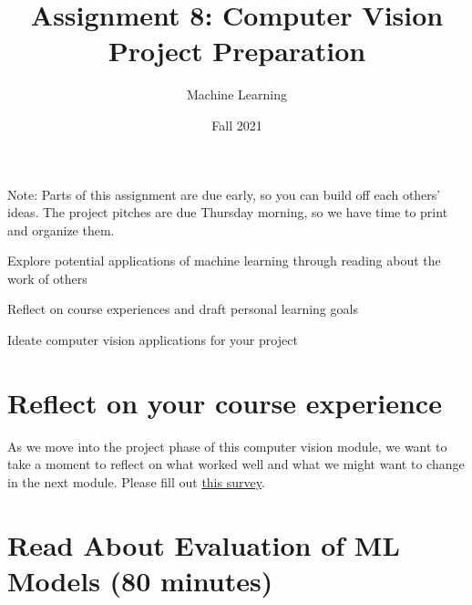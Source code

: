 \documentclass[assignment08_Solutions]{subfiles}
\title{Assignment 8: Computer Vision Project Preparation}
\author{Machine Learning}
\date{Fall 2021}
\begin{document}
\maketitle
\thispagestyle{firstpage}

Note: Parts of this assignment are due early, so you can build off each others' ideas. The project pitches are due Thursday morning, so we have time to print and organize them.
\vspace{2em}



\begin{learningobjectives}
\bi
\item Explore potential applications of machine learning through reading about the work of others
\item Reflect on course experiences and draft personal learning goals
\item Ideate computer vision applications for your project
\ei
\end{learningobjectives}


\section{Reflect on your course experience}
\begin{exercise}[(20 minutes)]
As we move into the project phase of this computer vision module, we want to take a moment to reflect on what worked well and what we might want to change in the next module. Please fill out \href{https://docs.google.com/forms/d/e/1FAIpQLScDaQrPQU8JprMdVAfXiR7LKJ0sndNgP-7foBCK347pxbVOxg/viewform}{this survey}.
\end{exercise}



\section{Read About Evaluation of ML Models (80 minutes)}
\end{document}
